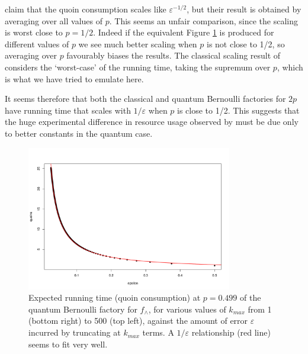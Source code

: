 \documentclass{article}
\theoremstyle{definition}
\begin{document}
\citet{patel2018} claim that the quoin consumption scales like $\varepsilon^{-1/2}$, but their result is obtained by averaging over all values of $p$. This seems an unfair comparison, since the scaling is worst close to $p=1/2$. Indeed if the equivalent Figure \ref{fig:eps_scaling} is produced for different values of $p$ we see much better scaling when $p$ is not close to 1/2, so averaging over $p$ favourably biases the results.
The classical scaling result of \citet[Theorem 1]{huber2016} considers the `worst-case' of the running time, taking the supremum over $p$, which is what we have tried to emulate here.

It seems therefore that both the classical and quantum Bernoulli factories for $2p$ have running time that scales with $1/\varepsilon$ when $p$ is close to 1/2. This suggests that the huge experimental difference in resource usage observed by \citet{patel2018} must be due only to better constants in the quantum case.

\begin{figure}
\centering
\includegraphics[width=0.8\textwidth]{eps_scaling.pdf}
\caption{Expected running time (quoin consumption) at $p=0.499$ of the quantum Bernoulli factory for $f_\wedge$, for various values of $k_{max}$ from 1 (bottom right) to 500 (top left), against the amount of error $\varepsilon$ incurred by truncating at $k_{max}$ terms. A $1/\varepsilon$ relationship (red line) seems to fit very well.}
\label{fig:eps_scaling}
\end{figure}
\end{document}
